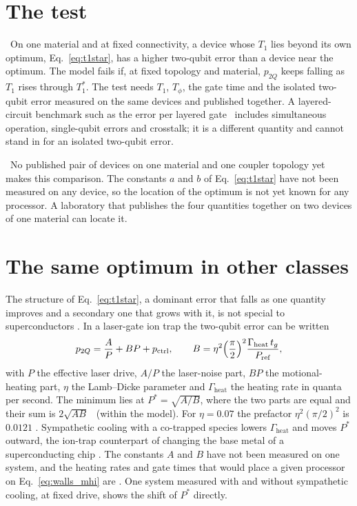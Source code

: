 \section{The test}

\prediction\ On one material and at fixed connectivity, a device whose $T_1$ lies beyond its own optimum,
Eq.~\eqref{eq:t1star}, has a higher two-qubit error than a device near the optimum. The model fails if, at fixed
topology and material, $p_{2Q}$ keeps falling as $T_1$ rises through $T_1^*$. The test needs $T_1$, $T_\phi$, the gate
time and the isolated two-qubit error measured on the same devices and published together. A layered-circuit benchmark
such as the error per layered gate~\cite{McKay2023} includes simultaneous operation, single-qubit errors and crosstalk;
it is a different quantity and cannot stand in for an isolated two-qubit error.

\openprob\ No published pair of devices on one material and one coupler topology yet makes this comparison. The
constants $a$ and $b$ of Eq.~\eqref{eq:t1star} have not been measured on any device, so the location of the optimum is
not yet known for any processor. A laboratory that publishes the four quantities together on two devices of one material can locate it.

\section{The same optimum in other classes}\label{sec:walls_other}

The structure of Eq.~\eqref{eq:t1star}, a dominant error that falls as one quantity improves and a secondary one that grows with it, is
not special to superconductors \conjecture. In a laser-gate ion trap the two-qubit error can be written
\begin{equation}
 p_{2Q}=\frac{A}{P}+BP+p_{\mathrm{ctrl}},\qquad B=\eta^2\Bigl(\frac{\pi}{2}\Bigr)^2\frac{\Gamma_{\mathrm{heat}}\,t_g}{P_{\mathrm{ref}}},
 \label{eq:walls_mhi}
\end{equation}
with $P$ the effective laser drive, $A/P$ the laser-noise part, $BP$ the motional-heating part, $\eta$ the Lamb--Dicke parameter and
$\Gamma_{\mathrm{heat}}$ the heating rate in quanta per second. The minimum lies at $P^*=\sqrt{A/B}$, where the two parts are equal and
their sum is $2\sqrt{AB}$ \derived\ (within the model). For $\eta=0.07$ the prefactor $\eta^2(\pi/2)^2$ is $0.0121$ \calc. Sympathetic
cooling with a co-trapped species lowers $\Gamma_{\mathrm{heat}}$ and moves $P^*$ outward, the ion-trap counterpart of changing the base
metal of a superconducting chip \interp. The constants $A$ and $B$ have not been measured on one system, and the heating rates and gate
times that would place a given processor on Eq.~\eqref{eq:walls_mhi} are \openprob. One system measured with and without sympathetic
cooling, at fixed drive, shows the shift of $P^*$ directly.

